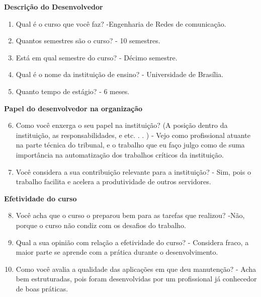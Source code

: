 \begin{apendicesenv}
\textbf{Descrição do Desenvolvedor}

\begin{enumerate}
	\item Qual é o curso que você faz?\newline
	-Engenharia de Redes de comunicação.
	\item Quantos semestres são o curso?\newline
	- 10 semestres.
	\item Está em qual semestre do curso?\newline
	- Décimo semestre.
	\item Qual é o nome da instituição de ensino?\newline
	- Universidade de Brasília.
	\item Quanto tempo de estágio?\newline
	- 6 meses.
\end{enumerate}

\textbf{Papel do desenvolvedor na organização}

\begin{enumerate}
	\setcounter{enumi}{5}
	\item Como você enxerga o seu papel na instituição? (A posição dentro da instituição, as
	responsabilidades, e etc. . . )\newline
	- Vejo como profissional atuante na parte técnica do tribunal, e o trabalho que eu faço julgo como de suma importância na automatização dos trabalhos críticos da instituição.
	\item Você considera a sua contribuição relevante para a instituição?\newline
	- Sim, pois o trabalho facilita e acelera a produtividade de outros servidores.
\end{enumerate}

\textbf{Efetividade do curso}

\begin{enumerate}
	\setcounter{enumi}{7}
	\item Você acha que o curso o preparou bem para as tarefas que realizou?\newline
	-Não, porque o curso não condiz com os desafios do trabalho.
	\item Qual a sua opinião com relação a efetividade do curso?\newline
	- Considera fraco, a maior parte se aprende com a prática durante o desenvolvimento.
	\item Como você avalia a qualidade das aplicações em que deu manutenção?\newline
	- Acha bem estruturadas, pois foram desenvolvidas por um profissional já conhecedor de boas práticas.
\end{enumerate}


\end{apendicesenv}
